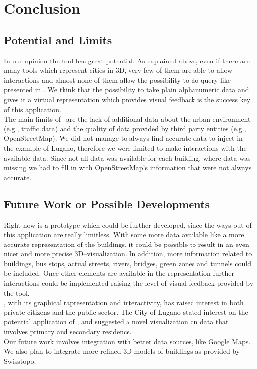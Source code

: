 \section{Conclusion} \label{conclusions}
\subsection{Potential and Limits}
In our opinion the tool has great potential. As explained above, even if there are many tools which represent cities in 3D, very few of them are able to allow interactions and almost none of them allow the possibility to do query like presented in \applicationName. We think that the possibility to take plain alphanumeric data and gives it a virtual representation which provides visual feedback is the success key of this application.\\

The main limits of \applicationName\ are the lack of additional data about the urban environment (e.g., traffic data) and the quality of data provided by third party entities (e.g., OpenStreetMap). We did not manage to always find accurate data to inject in the example of Lugano, therefore we were limited to make interactions with the available data. Since not all data was available for each building, where data was missing we had to fill in with OpenStreetMap's information that were not always accurate.

\subsection{Future Work or Possible Developments}
Right now \applicationName is a prototype which could be further developed, since the ways out of this application are really limitless. With some more data available like a more accurate representation of the buildings, it could be possible to result in an even nicer and more precise 3D--visualization. In addition, more information related to buildings, bus stops, actual streets, rivers, bridges, green zones and tunnels could be included. Once other elements are available in the representation further interactions could be implemented raising the level of visual feedback provided by the tool.\\

\applicationName, with its graphical rapresentation and interactivity, has raised interest in both private citizens and the public sector. The City of Lugano stated interest on the potential application of \applicationName, and suggested a novel visualization on data that involves primary and secondary residence.\\

Our future work involves integration with better data sources, like Google Maps. We also plan to integrate more refined 3D models of buildings as provided by Swisstopo.
